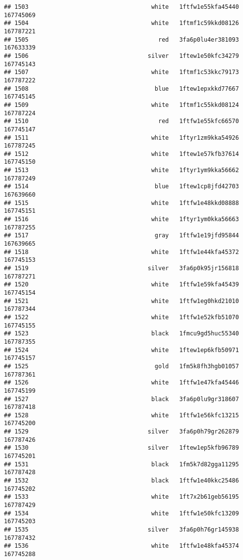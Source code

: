 \documentclass[
]{article}
\begin{document}
\begin{verbatim}
## 1503                                   white   1ftfw1e55kfa45440 167745069
## 1504                                   white   1ftmf1c59kkd08126 167787221
## 1505                                     red   3fa6p0lu4er381093 167633339
## 1506                                  silver   1ftew1e50kfc34279 167745143
## 1507                                   white   1ftmf1c53kkc79173 167787222
## 1508                                    blue   1ftew1epxkkd77667 167745145
## 1509                                   white   1ftmf1c55kkd08124 167787224
## 1510                                     red   1ftfw1e55kfc66570 167745147
## 1511                                   white   1ftyr1zm9kka54926 167787245
## 1512                                   white   1ftew1e57kfb37614 167745150
## 1513                                   white   1ftyr1ym9kka56662 167787249
## 1514                                    blue   1ftew1cp8jfd42703 167639660
## 1515                                   white   1ftfw1e48kkd08888 167745151
## 1516                                   white   1ftyr1ym0kka56663 167787255
## 1517                                    gray   1ftfw1e19jfd95844 167639665
## 1518                                   white   1ftfw1e44kfa45372 167745153
## 1519                                  silver   3fa6p0k95jr156818 167787271
## 1520                                   white   1ftfw1e59kfa45439 167745154
## 1521                                   white   1ftfw1eg0hkd21010 167787344
## 1522                                   white   1ftfw1e52kfb51070 167745155
## 1523                                   black   1fmcu9gd5huc55340 167787355
## 1524                                   white   1ftew1ep6kfb50971 167745157
## 1525                                    gold   1fm5k8fh3hgb01057 167787361
## 1526                                   white   1ftfw1e47kfa45446 167745199
## 1527                                   black   3fa6p0lu9gr318607 167787418
## 1528                                   white   1ftfw1e56kfc13215 167745200
## 1529                                  silver   3fa6p0h79gr262879 167787426
## 1530                                  silver   1ftew1ep5kfb96789 167745201
## 1531                                   black   1fm5k7d82gga11295 167787428
## 1532                                   black   1ftfw1e40kkc25486 167745202
## 1533                                   white   1ft7x2b61geb56195 167787429
## 1534                                   white   1ftfw1e50kfc13209 167745203
## 1535                                  silver   3fa6p0h76gr145938 167787432
## 1536                                   white   1ftfw1e48kfa45374 167745288

\end{verbatim}
\end{document}
